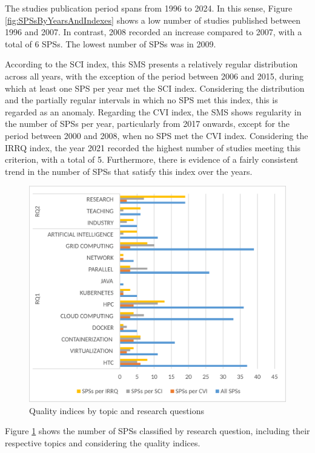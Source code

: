 The studies publication period spans from 1996 to 2024. In this sense, Figure \ref{fig:SPSsByYearsAndIndexes} shows a low number of studies published between 1996 and 2007. In contrast, 2008 recorded an increase compared to 2007, with a total of 6 SPSs. The lowest number of SPSs was in 2009.

According to the SCI index, this SMS presents a relatively regular distribution across all years, with the exception of the period between 2006 and 2015, during which at least one SPS per year met the SCI index. Considering the distribution and the partially regular intervals in which no SPS met this index, this is regarded as an anomaly. Regarding the CVI index, the SMS shows regularity in the number of SPSs per year, particularly from 2017 onwards, except for the period between 2000 and 2008, when no SPS met the CVI index. Considering the IRRQ index, the year 2021 recorded the highest number of studies meeting this criterion, with a total of 5. Furthermore, there is evidence of a fairly consistent trend in the number of SPSs that satisfy this index over the years.

\begin{figure}[ht]
	\centering
	\includegraphics[scale=0.179]{resources/figures/Imagen5.eps}
	\caption{Quality indices by topic and research questions}
	\label{fig:IndexesByTopicAndRQs}
\end{figure}

Figure \ref{fig:IndexesByTopicAndRQs} shows the number of SPSs classified by research question, including their respective topics and considering the quality indices.

